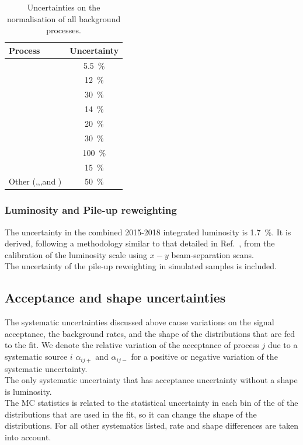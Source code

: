 \begin{table}[t]
	\small
	\centering
	\begin{tabular}{l c }
		\toprule
		\textbf{Process} & Uncertainty \\
		\midrule
		\ttbar & \SI{5.5}{\%} \\
		\ttV    & \SI{12}{\%} \\
		\tWZ & \SI{30}{\%} \\
		\tZq & \SI{14}{\%} \\
		\VVLF & \SI{20}{\%} \\
		\VVHF & \SI{30}{\%} \\
		\Zjets & \SI{100}{\%} \\
		 \ttH    & \SI{15}{\%} \\
		Other (\ttt,\tttt,\VVV,\VH and \ttWW) & \SI{50}{\%} \\		
		\bottomrule
	\end{tabular}
	\caption{Uncertainties on the normalisation of all background processes.}
	\label{tab:syst-crosssections}
\end{table}

\subsubsection{Luminosity and Pile-up reweighting} 
The uncertainty in the combined 2015-2018 integrated luminosity is
\SI{1.7}{\%}. It is derived, following a methodology similar to that
detailed in Ref.~\cite{DAPR-2013-01}, from the calibration of the
luminosity scale using $x-y$ beam-separation scans.\\
The uncertainty of the pile-up reweighting in simulated samples is included.

\subsection {Acceptance and shape uncertainties}
\label{sec:systematic:treatment}

The systematic uncertainties discussed above cause variations on the signal
acceptance, the background rates, and the shape of the distributions
that are fed to the fit.
We denote the relative variation of the acceptance of process $j$
due to a systematic source $i$ $\alpha_{ij+}$ and $\alpha_{ij-}$ for a
positive or negative variation of the systematic uncertainty.		\\
The only systematic uncertainty that has acceptance uncertainty
without a shape is luminosity.\\
The MC statistics is related to the statistical uncertainty in each
bin of the of the distributions that are used in the fit,
so it can change the shape of the distributions. 
For all other systematics listed, rate and shape differences are taken
into account. 
